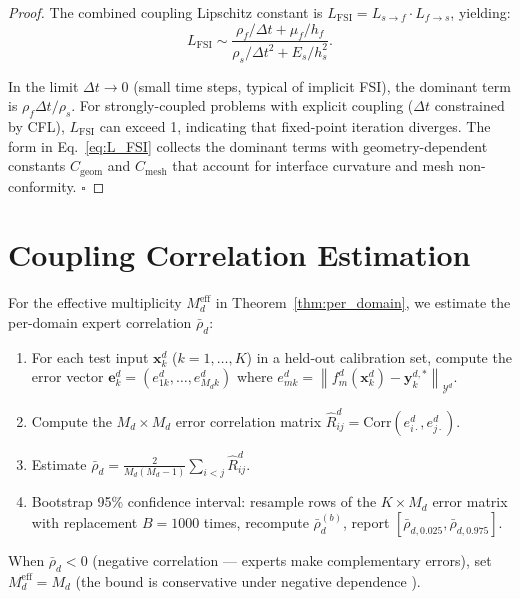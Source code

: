 \documentclass[11pt,a4paper]{article}
\theoremstyle{definition}
\newcommand{\norm}[1]{\left\lVert#1\right\rVert}
\begin{document}
\begin{proof}
The combined coupling Lipschitz constant is $L_{\mathrm{FSI}} = L_{s \to f} \cdot L_{f \to s}$, yielding:
\begin{equation}
L_{\mathrm{FSI}} \sim \frac{\rho_f / \Delta t + \mu_f / h_f}{\rho_s / \Delta t^2 + E_s / h_s^2}.
\end{equation}

In the limit $\Delta t \to 0$ (small time steps, typical of implicit FSI), the dominant term is $\rho_f \Delta t / \rho_s$. For strongly-coupled problems with explicit coupling ($\Delta t$ constrained by CFL), $L_{\mathrm{FSI}}$ can exceed 1, indicating that fixed-point iteration diverges. The form in Eq.~\eqref{eq:L_FSI} collects the dominant terms with geometry-dependent constants $C_{\mathrm{geom}}$ and $C_{\mathrm{mesh}}$ that account for interface curvature and mesh non-conformity. $\square$
\end{proof}

\section{Coupling Correlation Estimation}
\label{sec:app_correlation}

For the effective multiplicity $M_d^{\mathrm{eff}}$ in Theorem~\ref{thm:per_domain}, we estimate the per-domain expert correlation $\bar{\rho}_d$:

\begin{enumerate}
    \item For each test input $\mathbf{x}_k^d$ ($k = 1, \ldots, K$) in a held-out calibration set, compute the error vector $\mathbf{e}_k^d = (e_{1k}^d, \ldots, e_{M_d k}^d)$ where $e_{mk}^d = \norm{f_m^d(\mathbf{x}_k^d) - \mathbf{y}_k^{d,*}}_{\mathcal{Y}^d}$.
    \item Compute the $M_d \times M_d$ error correlation matrix $\hat{R}_{ij}^d = \mathrm{Corr}(e_{i\cdot}^d, e_{j\cdot}^d)$.
    \item Estimate $\bar{\rho}_d = \frac{2}{M_d(M_d-1)}\sum_{i<j} \hat{R}_{ij}^d$.
    \item Bootstrap 95\% confidence interval: resample rows of the $K \times M_d$ error matrix with replacement $B = 1000$ times, recompute $\bar{\rho}_d^{(b)}$, report $[\bar{\rho}_{d, 0.025}, \bar{\rho}_{d, 0.975}]$.
\end{enumerate}

When $\bar{\rho}_d < 0$ (negative correlation — experts make complementary errors), set $M_d^{\mathrm{eff}} = M_d$ (the bound is conservative under negative dependence \cite{Wainwright2019}).
\end{document}
